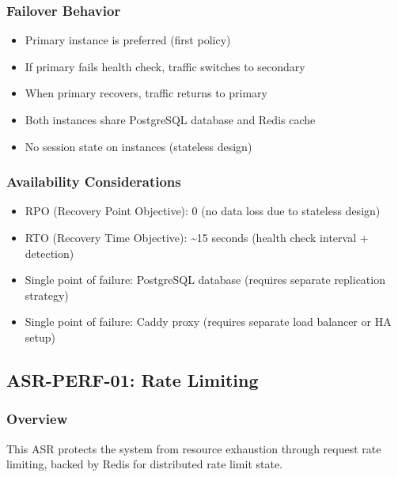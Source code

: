 \documentclass[12pt,oneside,a4paper]{article}
\begin{document}
\subsubsection{Failover Behavior}
\begin{itemize}
    \item Primary instance is preferred (first policy)
    \item If primary fails health check, traffic switches to secondary
    \item When primary recovers, traffic returns to primary
    \item Both instances share PostgreSQL database and Redis cache
    \item No session state on instances (stateless design)
\end{itemize}

\subsubsection{Availability Considerations}
\begin{itemize}
    \item RPO (Recovery Point Objective): 0 (no data loss due to stateless design)
    \item RTO (Recovery Time Objective): \textasciitilde 15 seconds (health check interval + detection)
    \item Single point of failure: PostgreSQL database (requires separate replication strategy)
    \item Single point of failure: Caddy proxy (requires separate load balancer or HA setup)
\end{itemize}

\subsection{ASR-PERF-01: Rate Limiting}

\subsubsection{Overview}
This ASR protects the system from resource exhaustion through request rate limiting, backed by Redis for distributed rate limit state.
\end{document}
